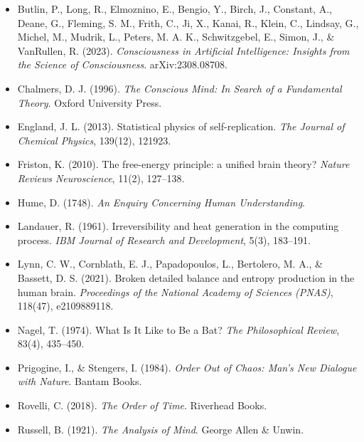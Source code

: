 \documentclass[11pt,a4paper]{article}
\begin{document}
\begin{itemize}[leftmargin=1.8em, itemindent=-1.8em, label={}, itemsep=0.45em]
    \item Butlin, P., Long, R., Elmoznino, E., Bengio, Y., Birch, J., Constant, A., Deane, G., Fleming, S. M., Frith, C., Ji, X., Kanai, R., Klein, C., Lindsay, G., Michel, M., Mudrik, L., Peters, M. A. K., Schwitzgebel, E., Simon, J., \& VanRullen, R. (2023). \emph{Consciousness in Artificial Intelligence: Insights from the Science of Consciousness}. arXiv:2308.08708.

    \item Chalmers, D. J. (1996). \emph{The Conscious Mind: In Search of a Fundamental Theory}. Oxford University Press.

    \item England, J. L. (2013). Statistical physics of self-replication. \emph{The Journal of Chemical Physics}, 139(12), 121923.

    \item Friston, K. (2010). The free-energy principle: a unified brain theory? \emph{Nature Reviews Neuroscience}, 11(2), 127--138.

    \item Hume, D. (1748). \emph{An Enquiry Concerning Human Understanding}.

    \item Landauer, R. (1961). Irreversibility and heat generation in the computing process. \emph{IBM Journal of Research and Development}, 5(3), 183--191.

    \item Lynn, C. W., Cornblath, E. J., Papadopoulos, L., Bertolero, M. A., \& Bassett, D. S. (2021). Broken detailed balance and entropy production in the human brain. \emph{Proceedings of the National Academy of Sciences (PNAS)}, 118(47), e2109889118.

    \item Nagel, T. (1974). What Is It Like to Be a Bat? \emph{The Philosophical Review}, 83(4), 435--450.

    \item Prigogine, I., \& Stengers, I. (1984). \emph{Order Out of Chaos: Man's New Dialogue with Nature}. Bantam Books.

    \item Rovelli, C. (2018). \emph{The Order of Time}. Riverhead Books.

    \item Russell, B. (1921). \emph{The Analysis of Mind}. George Allen \& Unwin.


\end{itemize}
\end{document}
